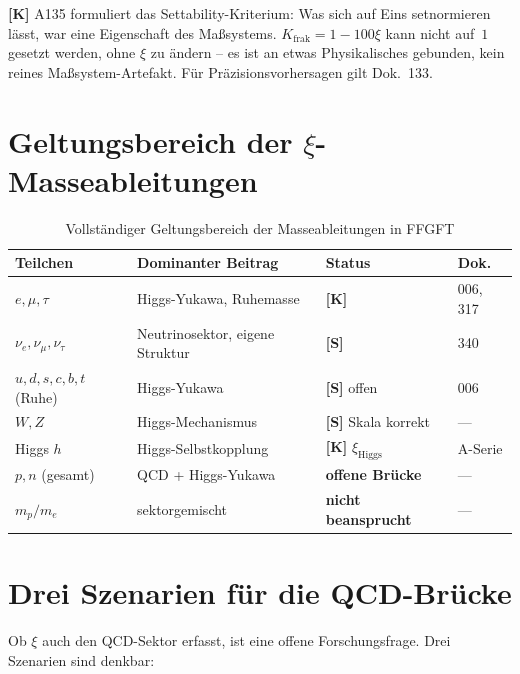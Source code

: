 \textbf{[K]} A135 formuliert das Settability-Kriterium: Was sich auf
Eins setnormieren lässt, war eine Eigenschaft des Maßsystems.
$K_{\text{frak}} = 1 - 100\xi$ kann nicht auf~$1$ gesetzt werden,
ohne $\xi$ zu ändern -- es ist an etwas Physikalisches gebunden,
kein reines Maßsystem-Artefakt. Für Präzisionsvorhersagen gilt
Dok.~133.

\section{Geltungsbereich der $\xi$-Masseableitungen}

\begin{table}[h]
\centering
\caption{Vollständiger Geltungsbereich der Masseableitungen in FFGFT}
\label{tab:geltung}
\begin{tabular}{llll}
\toprule
Teilchen & Dominanter Beitrag & Status & Dok. \\
\midrule
$e, \mu, \tau$ & Higgs-Yukawa, Ruhemasse
  & \textbf{[K]} & 006, 317 \\
$\nu_e, \nu_\mu, \nu_\tau$ & Neutrinosektor, eigene Struktur
  & \textbf{[S]} & 340 \\
$u, d, s, c, b, t$ (Ruhe) & Higgs-Yukawa
  & \textbf{[S]} offen & 006 \\
$W, Z$ & Higgs-Mechanismus
  & \textbf{[S]} Skala korrekt & --- \\
Higgs $h$ & Higgs-Selbstkopplung
  & \textbf{[K]} $\xi_{\mathrm{Higgs}}$ & A-Serie \\
$p, n$ (gesamt) & QCD + Higgs-Yukawa
  & \textbf{offene Brücke} & --- \\
$m_p/m_e$ & sektorgemischt
  & \textbf{nicht beansprucht} & --- \\
\bottomrule
\end{tabular}
\end{table}

\section{Drei Szenarien für die QCD-Brücke}

Ob $\xi$ auch den QCD-Sektor erfasst, ist eine offene Forschungsfrage.
Drei Szenarien sind denkbar:

